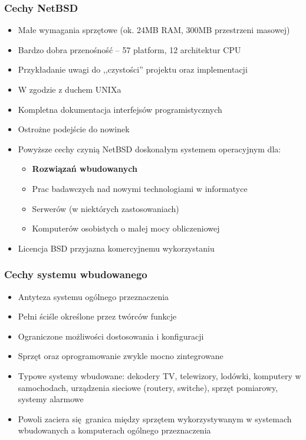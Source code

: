 \documentclass[dvipsnames,table]{beamer}
\begin{document}
\begin{frame}
\frametitle{Cechy NetBSD}
\begin{itemize}
	\item Małe wymagania sprzętowe (ok. 24MB RAM, 300MB przestrzeni masowej)
	\item Bardzo dobra przenośność -- 57 platform, 12 architektur CPU
	\item Przykładanie uwagi do ,,czystości'' projektu oraz implementacji
	\item W zgodzie z duchem UNIXa
	\item Kompletna dokumentacja interfejsów programistycznych
	\item Ostrożne podejście do nowinek
	\item Powyższe cechy czynią NetBSD doskonałym systemem operacyjnym dla:
	\begin{itemize}
		\item \textbf{Rozwiązań wbudowanych}
		\item Prac badawczych nad nowymi technologiami w informatyce
		\item Serwerów (w niektórych zastosowaniach)
		\item Komputerów osobistych o małej mocy obliczeniowej
	\end{itemize}
	\item Licencja BSD przyjazna komercyjnemu wykorzystaniu
\end{itemize}
\end{frame}

\begin{frame}
\frametitle{Cechy systemu wbudowanego}
\begin{itemize}
	\item Antyteza systemu ogólnego przeznaczenia
	\item Pełni ściśle określone przez twórców funkcje
	\item Ograniczone możliwości dostosowania i konfiguracji
	\item Sprzęt oraz oprogramowanie zwykle mocno zintegrowane
	\item Typowe systemy wbudowane: dekodery TV, telewizory, lodówki, komputery w samochodach, urządzenia sieciowe (routery, switche), sprzęt pomiarowy, systemy alarmowe
	\item Powoli zaciera się granica między sprzętem wykorzystywanym w systemach wbudowanych a komputerach ogólnego przeznaczenia
\end{itemize}
\end{frame}
\end{document}
